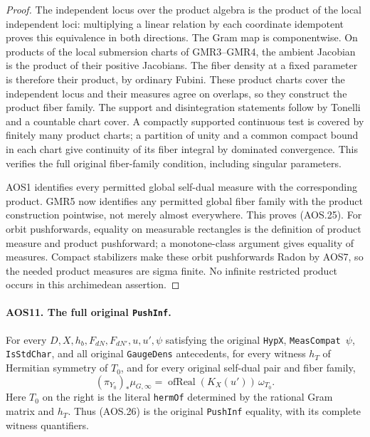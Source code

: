 \documentclass[11pt,a4paper]{article}
\numberwithin{equation}{section}
\theoremstyle{remark}\newtheorem{remark}[theorem]{Remark}
\begin{document}
\begin{proof}
The independent locus over the product algebra is the product of the
local independent loci: multiplying a linear relation by each
coordinate idempotent proves this equivalence in both directions.
The Gram map is componentwise.  On products
of the local submersion charts of GMR3--GMR4, the ambient Jacobian is
the product of their positive Jacobians.  The fiber density at a
fixed parameter is therefore their product, by ordinary Fubini.
These product charts cover the independent locus and their measures
agree on overlaps, so they construct the product fiber family.
The support and disintegration statements follow by Tonelli and a
countable chart cover.  A compactly supported continuous test is
covered by finitely many product charts; a partition of unity and
a common compact bound in each chart give continuity of its fiber
integral by dominated convergence.  This verifies the full original
fiber-family condition, including singular parameters.

AOS1 identifies every permitted global self-dual measure with the
corresponding product.  GMR5 now identifies any permitted global
fiber family with the product construction pointwise, not merely
almost everywhere.  This proves (AOS.25).  For orbit pushforwards,
equality on measurable rectangles is the definition of product
measure and product pushforward; a monotone-class argument gives
equality of measures.  Compact stabilizers make these orbit
pushforwards Radon by AOS7, so the needed product measures are
sigma finite.  No infinite restricted product occurs in this
archimedean assertion.
\end{proof}

\paragraph{AOS11. The full original \texttt{Push\allowbreak Inf}.}
\label{claim:AOS11}
For every $D,X,h_b,F_{dN},F_{dN'},u,u',\psi$ satisfying the original
\texttt{Hyp\allowbreak X}, \texttt{Meas\allowbreak Compat\,$\psi$}, \texttt{Is\allowbreak Std\allowbreak Char}, and
all original \texttt{Gauge\allowbreak Dens} antecedents, for every witness
$h_T$ of Hermitian symmetry of $T_0$, and for every original
self-dual pair and fiber family,
\[
             (\pi_{Y_0})_*\mu_{G,\infty}
                  =\operatorname{ofReal}(K_X(u'))\,\omega_{T_0}.
 \tag{AOS.26}
\]
Here $T_0$ on the right is the literal \texttt{herm\allowbreak Of} determined by
the rational Gram matrix and $h_T$.  Thus (AOS.26) is the original
\texttt{Push\allowbreak Inf} equality, with its complete witness quantifiers.
\end{document}
